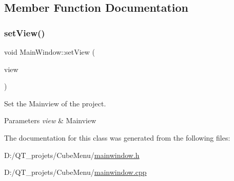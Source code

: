 \subsection{Member Function Documentation}
\hypertarget{class_main_window_adffbce021ec28108d1b1893bf43da5e0}{}\label{class_main_window_adffbce021ec28108d1b1893bf43da5e0} 
\subsubsection{\texorpdfstring{set\+View()}{setView()}}
{\footnotesize\ttfamily void Main\+Window\+::set\+View (\begin{DoxyParamCaption}\item[{\hyperlink{class_main_view}{Main\+View} $\ast$}]{view }\end{DoxyParamCaption})}



Set the Mainview of the project. 


\begin{DoxyParams}{Parameters}
{\em view} & Mainview \\
\hline
\end{DoxyParams}


The documentation for this class was generated from the following files\+:\begin{DoxyCompactItemize}
\item 
D\+:/\+Q\+T\+\_\+projets/\+Cube\+Menu/\hyperlink{mainwindow_8h}{mainwindow.\+h}\item 
D\+:/\+Q\+T\+\_\+projets/\+Cube\+Menu/\hyperlink{mainwindow_8cpp}{mainwindow.\+cpp}\end{DoxyCompactItemize}
